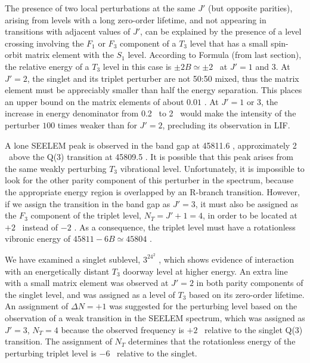 \documentclass[12pt]{mitthesis}
\begin{document}
The presence of two local perturbations at the same $J'$ (but opposite
parities), arising from levels with a long zero-order lifetime, and
not appearing in transitions with adjacent values of $J'$, can be
explained by the presence of a level crossing involving the $F_1$ or
$F_3$ component of a $T_3$ level that has a small spin-orbit matrix
element with the $S_1$ level.  According to Formula (from last
section), the relative energy of a $T_3$ level in this case is $\pm 2B
\simeq \pm 2$ \rcm\ at $J'=1$ and $3$.  At $J'=2$, the singlet and its
triplet perturber are not 50:50 mixed, thus the matrix element must be
appreciably smaller than half the energy separation.  This places an
upper bound on the matrix elements of about $0.01$ \rcm.  At $J'=1$ or
$3$, the increase in energy denominator from 0.2 \rcm\ to 2 \rcm\
would make the intensity of the perturber $100$ times weaker than for
$J'=2$, precluding its observation in LIF.

A lone SEELEM peak is observed in the band gap at 45811.6 \rcm,
approximately 2 \rcm\ above the Q(3) transition at 45809.5 \rcm.  It
is possible that this peak arises from the same weakly perturbing
$T_3$ vibrational level.  Unfortunately, it is impossible to look for
the other parity component of this perturber in the spectrum, because
the appropriate energy region is overlapped by an R-branch transition.
However, if we assign the transition in the band gap as $J'=3$, it
must also be assigned as the $F_3$ component of the triplet level,
$N_T=J'+1=4$, in order to be located at $+2$ \rcm\ instead of $-2$
\rcm.  As a consequence, the triplet level must have a rotationless
vibronic energy of $45811 - 6B \simeq 45804$ \rcm.

We have examined a singlet sublevel, $3^24^2$ , which shows
evidence of interaction with an energetically distant $T_3$ doorway
level at higher energy.  An extra line with a small matrix element was
observed at $J'=2$ in both parity components of the singlet level, and
was assigned as a level of $T_3$ based on its zero-order lifetime.  An
assignment of $\Delta N=+1$ was suggested for the perturbing level
based on the observation of a weak transition in the SEELEM spectrum,
which was assigned as $J'=3$, $N_T=4$ because the observed frequency
is $+2$ \rcm\ relative to the singlet Q(3) transition.  The assignment
of $N_T$ determines that the rotationless energy of the perturbing
triplet level is $-6$ \rcm\ relative to the singlet.

\end{document}
